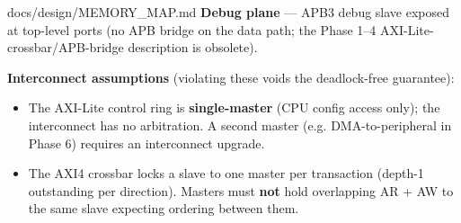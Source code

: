 \begin{relocated}{docs/design/MEMORY_MAP.md}
\textbf{Debug plane} --- APB3 debug slave exposed at top-level ports (no
APB bridge on the data path; the Phase 1--4
AXI-Lite-crossbar/\allowbreak{}APB-bridge description is obsolete).

\textbf{Interconnect assumptions} (violating these voids the
deadlock-free guarantee):

\begin{itemize}
\tightlist
\item
  The AXI-Lite control ring is \textbf{single-master} (CPU config access
  only); the interconnect has no arbitration. A second master (e.g.
  DMA-to-peripheral in Phase 6) requires an interconnect upgrade.
\item
  The AXI4 crossbar locks a slave to one master per transaction (depth-1
  outstanding per direction). Masters must \textbf{not} hold overlapping
  AR + AW to the same slave expecting ordering between them.
\end{itemize}
\end{relocated}

